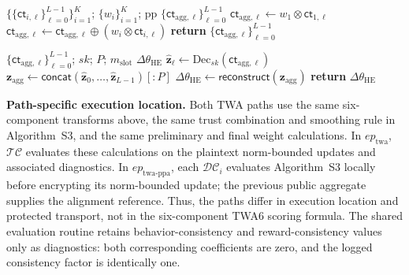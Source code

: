 \documentclass{article}
\begin{document}
\begin{algorithm}[H]
  \caption{\textsc{HEWeightedAggregate} at $\mathcal{AC}$}
  \label{alg:heagg}
  \begin{algorithmic}[1]
  \REQUIRE $\{\{\mathsf{ct}_{i,\ell}\}_{\ell=0}^{L-1}\}_{i=1}^{K}$; $\{w_i\}_{i=1}^{K}$; $\mathrm{pp}$
  \ENSURE $\{\mathsf{ct}_{\mathrm{agg},\ell}\}_{\ell=0}^{L-1}$
    \STATE $\mathsf{ct}_{\mathrm{agg},\ell}\leftarrow w_1\otimes\mathsf{ct}_{1,\ell}$
      \STATE $\mathsf{ct}_{\mathrm{agg},\ell}\leftarrow\mathsf{ct}_{\mathrm{agg},\ell}\oplus(w_i\otimes\mathsf{ct}_{i,\ell})$
    \ENDFOR
  \ENDFOR
  \STATE \textbf{return} $\{\mathsf{ct}_{\mathrm{agg},\ell}\}_{\ell=0}^{L-1}$
  \end{algorithmic}
  \end{algorithm}

\begin{algorithm}[H]
  \caption{\textsc{DecryptAggregate} at $\mathcal{KA}$}
  \label{alg:decagg}
  \begin{algorithmic}[1]
  \REQUIRE $\{\mathsf{ct}_{\mathrm{agg},\ell}\}_{\ell=0}^{L-1}$; $sk$; $P$; $m_{\mathrm{slot}}$
  \ENSURE $\Delta\theta_{\mathrm{HE}}$
    \STATE $\hat{\mathbf{z}}_\ell\leftarrow\mathrm{Dec}_{sk}(\mathsf{ct}_{\mathrm{agg},\ell})$
  \ENDFOR
  \STATE $\mathbf{z}_{\mathrm{agg}}\leftarrow\mathsf{concat}(\hat{\mathbf{z}}_0,\ldots,\hat{\mathbf{z}}_{L-1})[:P]$
  \STATE $\Delta\theta_{\mathrm{HE}}\leftarrow\mathsf{reconstruct}(\mathbf{z}_{\mathrm{agg}})$
  \STATE \textbf{return} $\Delta\theta_{\mathrm{HE}}$
\end{algorithmic}
\end{algorithm}

\noindent\textbf{Path-specific execution location.}
Both TWA paths use the same six-component transforms above, the same trust
combination and smoothing rule in Algorithm~S3, and the same preliminary and
final weight calculations. In $ep_{\mathrm{twa}}$, $\mathcal{TC}$ evaluates
these calculations on the plaintext norm-bounded updates and associated
diagnostics. In $ep_{\mathrm{twa\text{-}ppa}}$, each $\mathcal{DC}_i$
evaluates Algorithm~S3 locally before encrypting its norm-bounded update; the
previous public aggregate supplies the alignment reference. Thus, the paths
differ in execution location and protected transport, not in the six-component
TWA6 scoring formula. The shared evaluation routine retains behavior-consistency and
reward-consistency values only as diagnostics: both corresponding coefficients
are zero, and the logged consistency factor is identically one.
\end{document}

